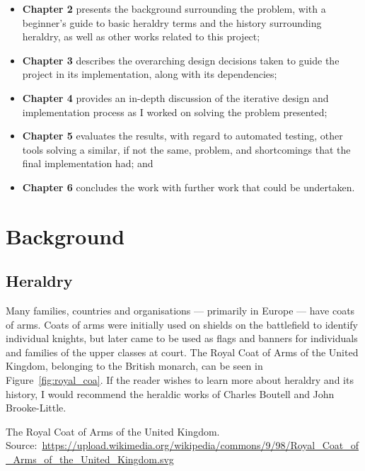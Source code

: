\documentclass[nobib, a4paper, twoside, justified]{tufte-book}
\begin{document}
\begin{itemize}
  \item \textbf{Chapter 2} presents the background surrounding the problem, with a beginner's
    guide to basic heraldry terms and the history surrounding heraldry, as well as other works
    related to this project;
  \item \textbf{Chapter 3} describes the overarching design decisions taken to guide the project in
    its implementation, along with its dependencies;
  \item \textbf{Chapter 4} provides an in-depth discussion of the iterative design and implementation
    process as I worked on solving the problem presented;
  \item \textbf{Chapter 5} evaluates the results, with regard to automated testing, other tools
    solving a similar, if not the same, problem, and shortcomings that the final implementation
    had; and
  \item \textbf{Chapter 6} concludes the work with further work that could be undertaken.
\end{itemize}

\chapter{Background}\label{cha:background}

\section{Heraldry}\label{sec:heraldry}

Many families, countries and organisations --- primarily in Europe --- have coats of arms. Coats of
arms were initially used on shields on the battlefield to identify individual knights, but later
came to be used as flags and banners for individuals and families of the upper classes at court.
The Royal Coat of Arms of the United Kingdom, belonging to the British monarch, can be seen in
Figure~\ref{fig:royal_coa}. If the reader wishes to learn more about heraldry and its history, I
would recommend the heraldic works of Charles Boutell and John Brooke-Little.

\begin{marginfigure}
  \centering
  \def\svgwidth{0.8\linewidth}
  
  \caption{The Royal Coat of Arms of the United Kingdom.
  Source:~\url{https://upload.wikimedia.org/wikipedia/commons/9/98/Royal_Coat_of_Arms_of_the_United_Kingdom.svg}}%
  \label{fig:royal_coa}
\end{marginfigure}
\end{document}
